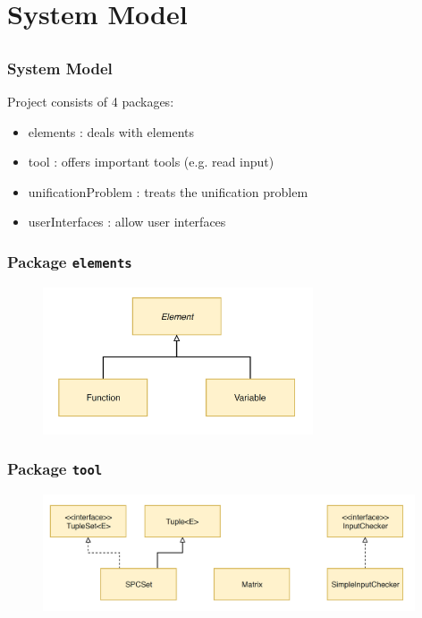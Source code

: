 \section{System Model} \subsection{}
	
	\begin{frame}[fragile=singleslide]
	\frametitle{System Model}
	 
	Project consists of 4 packages:
		\begin{itemize}
			\item elements : deals with elements
			\item tool : offers important tools (e.g. read input)
			\item unificationProblem : treats the unification problem
			\item userInterfaces : allow user interfaces
		\end{itemize}
	
  \end{frame}	
		

	\begin{frame}[fragile=singleslide]
	\frametitle{Package \texttt{elements}}
	
	\begin{figure}
		\centering
			\includegraphics[width=8cm]{Bilder/elements.PNG}
		\label{fig:elements}
	\end{figure}
	
  \end{frame}	


	\begin{frame}[fragile=singleslide]
	\frametitle{Package \texttt{tool}}
	 
	\begin{figure}
		\centering
			\includegraphics[width=11cm]{Bilder/tool.PNG}
		\label{fig:elements}
	\end{figure}
	
  \end{frame}	

